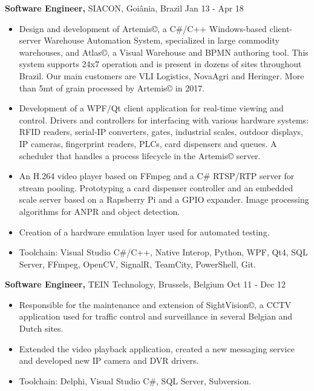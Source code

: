 \documentclass[margin]{res}
\begin{document}
\begin{resume}
 {\bf Software Engineer,} SIACON, Goiânia, Brazil \hfill Jan 13 - Apr 18
 \begin{itemize} \itemsep -2pt  %
 \item Design and development of Artemis©, a C\#/C++ Windows-based client-server Warehouse Automation System, specialized in large commodity warehouses, and Atlas©, a Visual Warehouse and BPMN authoring tool. This system supports 24x7 operation and is present in dozens of sites throughout Brazil. Our main customers are VLI Logistics, NovaAgri and Heringer. More than 5mt of grain processed by Artemis© in 2017.
 \item Development of a WPF/Qt client application for real-time viewing and control. Drivers and controllers for interfacing with various hardware systems: RFID readers, serial-IP converters, gates, industrial scales, outdoor displays, IP cameras, fingerprint readers, PLCs, card dispensers and queues. A scheduler that handles a process lifecycle in the Artemis© server.
 \item An H.264 video player based on FFmpeg and a C\# RTSP/RTP server for stream pooling. Prototyping a card dispenser controller and an embedded scale server based on a Rapsberry Pi and a GPIO expander. Image processing algorithms for ANPR and object detection.
 \item Creation of a hardware emulation layer used for automated testing.
 \item Toolchain: Visual Studio C\#/C++, Native Interop, Python, WPF, Qt4, SQL Server, FFmpeg, OpenCV, SignalR, TeamCity, PowerShell, Git.
\end{itemize}
 
 {\bf Software Engineer,} TEIN Technology, Brussels, Belgium \hfill Oct 11 - Dec 12
 \begin{itemize} \itemsep -2pt  %
 \item Responsible for the maintenance and extension of SightVision©, a CCTV application used for traffic control and surveillance in several Belgian and Dutch sites.
 \item Extended the video playback application, created a new messaging service and developed new IP camera and DVR drivers.
 \item Toolchain: Delphi, Visual Studio C\#, SQL Server, Subversion.
 \end{itemize}
 

\end{resume}
\end{document}
